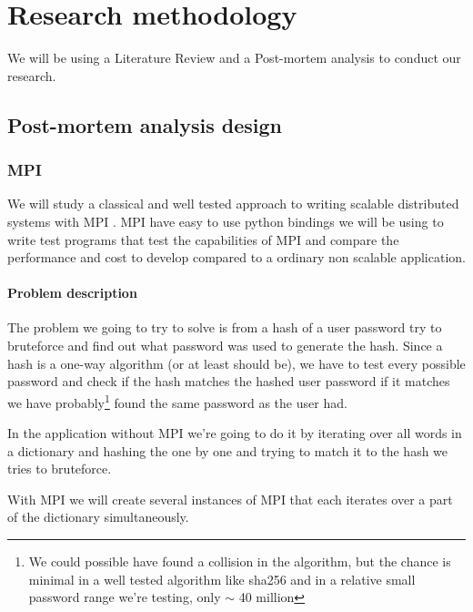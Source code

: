 \documentclass{article}
\begin{document}
{\begin{itemize}
\end{itemize}

\section{Research methodology}

We will be using a Literature Review and a Post-mortem analysis to conduct our 
research. 


\subsection{Post-mortem analysis design}

\subsubsection{MPI}
We will study a classical and well tested approach to writing
scalable distributed systems with MPI \cite{gropp1996high}. MPI have easy
to use python bindings \cite{miller2002pympi} \cite{millerparallel} we will be
using to write test programs that test the capabilities of MPI and compare the
performance and cost to develop compared to a ordinary non scalable application.

\paragraph{Problem description}
The problem we going to try to solve is from a hash of a user password try to
bruteforce and find out what password was used to generate the hash.
Since a hash is a one-way algorithm (or at least should be), we have to
test every possible password and check if the hash matches the hashed user password
if it matches we have probably\footnote{We could possible have found a
collision in the algorithm, but the chance is minimal in a well tested algorithm
like sha256 and in a relative small password range we're testing, only $\sim$
40 million } found the same password as the user had.

In the application without MPI we're going to do it by iterating over all words
in a dictionary and hashing the one by one and trying to match it to the hash
we tries to bruteforce.

With MPI we will create several instances of MPI that each iterates over a part
of the dictionary simultaneously.

}
\end{document}
